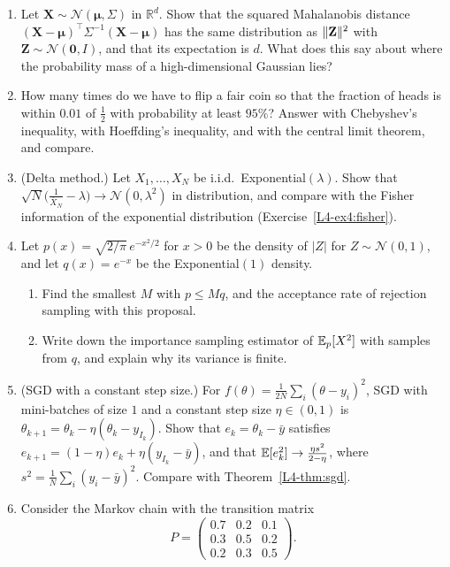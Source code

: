\begin{enumerate}[leftmargin=*]
    \item Let $\mathbf{X} \sim \mathcal{N}(\boldsymbol{\mu}, \Sigma)$ in $\mathbb{R}^d$. Show that the squared Mahalanobis distance $(\mathbf{X} - \boldsymbol{\mu})^\top\Sigma^{-1}(\mathbf{X} - \boldsymbol{\mu})$ has the same distribution as $\lVert \mathbf{Z} \rVert^2$ with $\mathbf{Z} \sim \mathcal{N}(\mathbf{0}, I)$, and that its expectation is $d$. What does this say about where the probability mass of a high-dimensional Gaussian lies?
    \item \homework{} How many times do we have to flip a fair coin so that the fraction of heads is within $0.01$ of $\frac{1}{2}$ with probability at least $95\%$? Answer with Chebyshev's inequality, with Hoeffding's inequality, and with the central limit theorem, and compare.
    \item \homework{} (Delta method.) Let $X_1, \ldots, X_N$ be i.i.d.\ Exponential$(\lambda)$. Show that $\sqrt{N}\big(\frac{1}{\bar X_N} - \lambda\big) \to \mathcal{N}(0, \lambda^2)$ in distribution, and compare with the Fisher information of the exponential distribution (Exercise~\ref{L4-ex4:fisher}).
    \item \homework{} Let $p(x) = \sqrt{2/\pi}\,e^{-x^2/2}$ for $x > 0$ be the density of $|Z|$ for $Z \sim \mathcal{N}(0, 1)$, and let $q(x) = e^{-x}$ be the Exponential$(1)$ density.
    \begin{enumerate}[label=(\alph*)]
        \item Find the smallest $M$ with $p \leq Mq$, and the acceptance rate of rejection sampling with this proposal.
        \item Write down the importance sampling estimator of $\mathbb{E}_p[X^2]$ with samples from $q$, and explain why its variance is finite.
    \end{enumerate}
    \item (SGD with a constant step size.) For $f(\theta) = \frac{1}{2N}\sum_i (\theta - y_i)^2$, SGD with mini-batches of size $1$ and a constant step size $\eta \in (0, 1)$ is $\theta_{k+1} = \theta_k - \eta(\theta_k - y_{I_k})$. Show that $e_k = \theta_k - \bar y$ satisfies $e_{k+1} = (1 - \eta)e_k + \eta(y_{I_k} - \bar y)$, and that $\mathbb{E}[e_k^2] \to \frac{\eta s^2}{2 - \eta}$, where $s^2 = \frac{1}{N}\sum_i (y_i - \bar y)^2$. Compare with Theorem~\ref{L4-thm:sgd}.
    \item \homework{} Consider the Markov chain with the transition matrix
    \[P = \begin{pmatrix} 0.7 & 0.2 & 0.1 \\ 0.3 & 0.5 & 0.2 \\ 0.2 & 0.3 & 0.5 \end{pmatrix}.\]

\end{enumerate}
